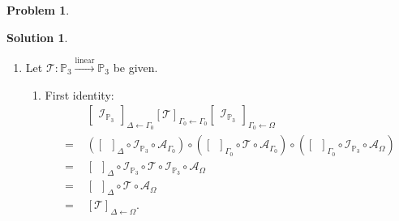 \documentclass{book}
\theoremstyle{definition}
\newtheorem*{prob*}{Problem}
\newtheorem*{sln*}{Solution}
\newcommand{\lin}{\overset{\text{linear}}{\longrightarrow}}
\newcommand{\T}{\mathcal{T}}
\begin{document}
\begin{prob*}
\begin{sln*}
\begin{enumerate}
			\item Let $\T : \mathbb{P}_3 \lin \mathbb{P}_3$ be given. 
			\begin{enumerate}
				\item First identity:
				\begin{align*}
				&\begin{bmatrix}
				\mathcal{I}_{\mathbb{P}_3}
				\end{bmatrix}_{\Delta \leftarrow \Gamma_0} [\mathcal{T}]_{\Gamma_0 \leftarrow \Gamma_0} 
				\begin{bmatrix}
				\mathcal{I}_{\mathbb{P}_3}
				\end{bmatrix}_{\Gamma_0 \leftarrow \Omega}	\\
				=\,\,
				&\left([\,\,\,]_{\Delta}\circ\mathcal{I}_{\mathbb{P}_3} \circ \mathcal{A}_{\Gamma_0}\right) \circ \left([\,\,\,]_{\Gamma_0}\circ \T \circ \mathcal{A}_{\Gamma_0}\right) \circ \left([\,\,\,]_{\Gamma_0} \circ \mathcal{I}_{\mathbb{P}_3} \circ \mathcal{A}_{\Omega}\right) \\
				=\,\,
				&[\,\,\,]_\Delta \circ \mathcal{I}_{\mathbb{P}_3}\circ \T \circ \mathcal{I}_{\mathbb{P}_3}\circ \mathcal{A}_\Omega\\
				=\,\,
				&[\,\,\,]_\Delta \circ  \T \circ \mathcal{A}_\Omega\\
				=\,\,
				&[\T]_{\Delta\leftarrow\Omega}.
				\end{align*}
				

\end{enumerate}
\end{enumerate}
\end{sln*}
\end{prob*}
\end{document}
